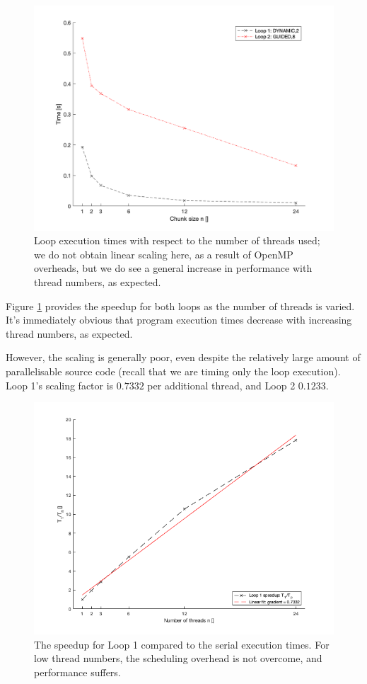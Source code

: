 \documentclass{article} %
\begin{document}
\begin{figure}
    \centering
    \includegraphics[height=.35\textheight]{part1_plots/bestruns_all}
    \caption{Loop execution times with respect to the number of threads used; we do not obtain linear scaling here, as a result of OpenMP overheads, but we do see a general increase in performance with thread numbers, as expected.}
    \label{fig:threadall}
\end{figure}

Figure \ref{fig:threadall} provides the speedup for both loops as the number of threads is varied.
It's immediately obvious that program execution times decrease with increasing thread numbers, as expected.

However, the scaling is generally poor, even despite the relatively large amount of parallelisable source code (recall that we are timing only the loop execution).
Loop 1's scaling factor is $0.7332$ per additional thread, and Loop 2 $0.1233$. 

\begin{figure}
    \centering
    \includegraphics[height=.35\textheight]{part1_plots/loop1_speedup.png}
    \caption{The speedup for Loop 1 compared to the serial execution times. For low thread numbers, the scheduling overhead is not overcome, and performance suffers.}
    \label{fig:loop1speedup}
\end{figure}
\end{document}
